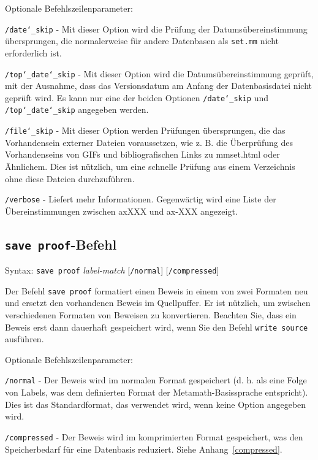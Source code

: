 Optionale Befehlszeilenparameter:

    \texttt{/date{\char`\_}skip} - Mit dieser Option wird die Prüfung der Datums\-über\-ein\-stimmung übersprungen, die normalerweise für andere Datenbasen als \texttt{set.mm} nicht erforderlich ist.

    \texttt{/top{\char`\_}date{\char`\_}skip} - Mit dieser Option wird die Datumsübereinstimmung geprüft, mit der Ausnahme, dass das Versionsdatum am Anfang der Datenbasisdatei nicht geprüft wird.  Es kann nur eine der beiden Optionen \texttt{/date{\char`\_}skip} und \texttt{/top{\char`\_}date{\char`\_}skip} angegeben werden.

    \texttt{/file{\char`\_}skip} - Mit dieser Option werden Prüfungen übersprungen, die das Vorhandensein externer Dateien voraussetzen, wie z. B. die Überprüfung des Vorhandenseins von GIFs und bibliografischen Links zu mmset.html oder Ähnlichem.  Dies ist nützlich, um eine schnelle Prüfung aus einem Verzeichnis ohne diese Dateien durchzuführen.

    \texttt{/verbose} - Liefert mehr Informationen.  Gegenwärtig wird eine Liste der Übereinstimmungen zwischen axXXX und ax-XXX angezeigt.


\subsection{\texttt{save proof}-Befehl}

Syntax:  \texttt{save proof} {\em label-match} [\texttt{/normal}]
   [\texttt{/compressed}]

   Der Befehl \texttt{save proof} formatiert einen Beweis in einem von zwei Formaten neu und ersetzt den vorhandenen Beweis im Quellpuffer.  Er ist nützlich, um zwischen verschiedenen Formaten von Beweisen zu konvertieren.  Beachten Sie, dass ein Beweis erst dann dauerhaft gespeichert wird, wenn Sie den Befehl \texttt{write source} ausführen. 

Optionale Befehlszeilenparameter:

    \texttt{/normal} - Der Beweis wird im normalen Format gespeichert (d. h. als eine Folge von Labels, was dem definierten Format der Metamath-Basissprache entspricht).  Dies ist das Standardformat, das verwendet wird, wenn keine Option angegeben wird.

    \texttt{/compressed} - Der Beweis wird im komprimierten Format gespeichert, was den Speicherbedarf für eine Datenbasis reduziert. Siehe Anhang~\ref{compressed}.


